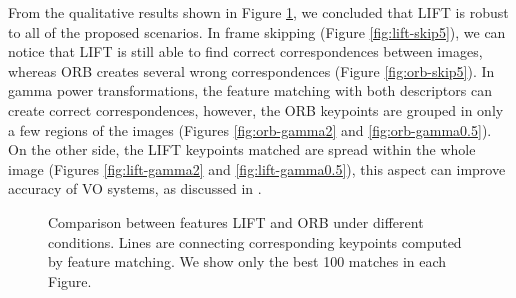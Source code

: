 From the qualitative results shown in Figure \ref{fig:lift-orb-features}, we concluded that LIFT is robust to all of the proposed scenarios. In frame skipping (Figure \ref{fig:lift-skip5}), we can notice that LIFT is still able to find correct correspondences between images, whereas ORB creates several wrong correspondences (Figure \ref{fig:orb-skip5}). In gamma power transformations, the feature matching with both descriptors can create correct correspondences, however, the ORB keypoints are grouped in only a few regions of the images (Figures \ref{fig:orb-gamma2} and \ref{fig:orb-gamma0.5}). On the other side, the LIFT keypoints matched are spread within the whole image (Figures \ref{fig:lift-gamma2} and \ref{fig:lift-gamma0.5}), this aspect can improve accuracy of VO systems, as discussed in \cite{tutorial-vo-2}.

\begin{figure}
\centering
{}






\caption{Comparison between features LIFT and ORB under different conditions. Lines are connecting corresponding keypoints computed by feature matching. We show only the best 100 matches in each Figure.}
\label{fig:lift-orb-features}
\end{figure}


